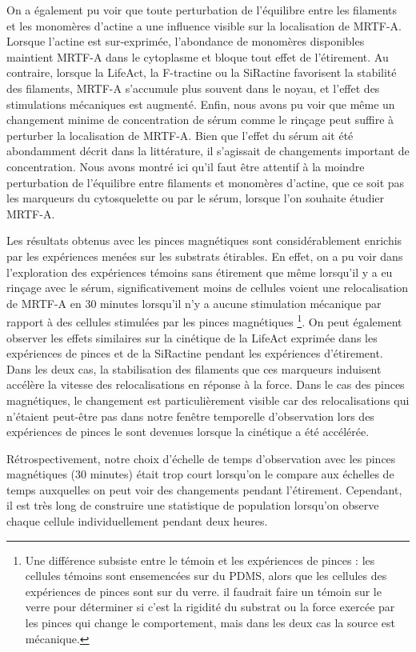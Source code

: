 On a également pu voir que toute perturbation de l'équilibre entre les filaments et les monomères d'actine a une influence visible sur la localisation de MRTF-A. Lorsque l'actine est sur-exprimée, l'abondance de monomères disponibles maintient MRTF-A dans le cytoplasme et bloque tout effet de l'étirement. Au contraire, lorsque la LifeAct, la F-tractine ou la SiRactine favorisent la stabilité des filaments, MRTF-A s'accumule plus souvent dans le noyau, et l'effet des stimulations mécaniques est augmenté. Enfin, nous avons pu voir que même un changement minime de concentration de sérum comme le rinçage peut suffire à perturber la localisation de MRTF-A. Bien que l'effet du sérum ait été abondamment décrit dans la littérature, il s'agissait de changements important de concentration. Nous avons montré ici qu'il faut être attentif à la moindre perturbation de l'équilibre entre filaments et monomères d'actine, que ce soit pas les marqueurs du cytosquelette ou par le sérum, lorsque l'on souhaite étudier MRTF-A. 

Les résultats obtenus avec les pinces magnétiques sont considérablement enrichis par les expériences menées sur les substrats étirables. En effet, on a pu voir dans l'exploration des expériences témoins sans étirement que même lorsqu'il y a eu rinçage avec le sérum, significativement moins de cellules voient une relocalisation de MRTF-A en 30 minutes lorsqu'il n'y a aucune stimulation mécanique par rapport à des cellules stimulées par les pinces magnétiques \footnote{Une différence subsiste entre le témoin et les expériences de pinces : les cellules témoins sont ensemencées sur du PDMS, alors que les cellules des expériences de pinces sont sur du verre. il faudrait faire un témoin sur le verre pour déterminer si c'est la rigidité du substrat ou la force exercée par les pinces qui change le comportement, mais dans les deux cas la source est mécanique. }. On peut également observer les effets similaires sur la cinétique de la LifeAct exprimée dans les expériences de pinces et de la SiRactine pendant les expériences d'étirement. Dans les deux cas, la stabilisation des filaments que ces marqueurs induisent accélère la vitesse des relocalisations en réponse à la force. Dans le cas des pinces magnétiques, le changement est particulièrement visible car des relocalisations qui n'étaient peut-être pas dans notre fenêtre temporelle d'observation lors des expériences de pinces le sont devenues lorsque la cinétique a été accélérée. 

Rétrospectivement, notre choix d'échelle de temps d'observation avec les pinces magnétiques (30 minutes) était trop court lorsqu'on le compare aux échelles de temps auxquelles on peut voir des changements pendant l'étirement. Cependant, il est très long de construire une statistique de population lorsqu'on observe chaque cellule individuellement pendant deux heures. 

